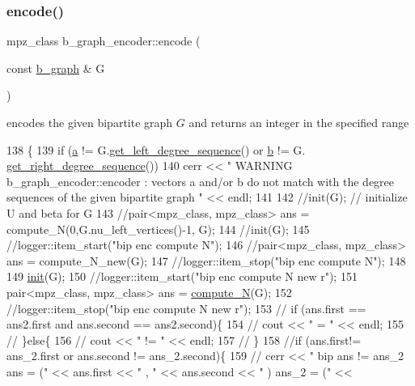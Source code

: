 \subsubsection{\texorpdfstring{encode()}{encode()}}
{\footnotesize\ttfamily mpz\+\_\+class b\+\_\+graph\+\_\+encoder\+::encode (\begin{DoxyParamCaption}\item[{const \hyperlink{classb__graph}{b\+\_\+graph} \&}]{G }\end{DoxyParamCaption})}



encodes the given bipartite graph $G$ and returns an integer in the specified range 


\begin{DoxyCode}
138 \{
139   \textcolor{keywordflow}{if} (\hyperlink{classb__graph__encoder_afd22d167f495cd85b41397f337c377c2}{a} != G.\hyperlink{classb__graph_afd65fb655f7e24217393a10533b87d3c}{get\_left\_degree\_sequence}() or \hyperlink{classb__graph__encoder_a767826e268702e45ab71565e096a52b8}{b} != G.
      \hyperlink{classb__graph_a2711566385b92b02f4c03abdc1f9a582}{get\_right\_degree\_sequence}())
140     cerr << \textcolor{stringliteral}{" WARNING b\_graph\_encoder::encoder : vectors a and/or b do not match with the degree sequences
       of the given bipartite graph  "} << endl;
141 
142   \textcolor{comment}{//init(G); // initialize U and beta for G}
143   \textcolor{comment}{//pair<mpz\_class, mpz\_class> ans = compute\_N(0,G.nu\_left\_vertices()-1, G);}
144   \textcolor{comment}{//init(G);}
145   \textcolor{comment}{//logger::item\_start("bip enc compute N");}
146   \textcolor{comment}{//pair<mpz\_class, mpz\_class> ans = compute\_N\_new(G);}
147   \textcolor{comment}{//logger::item\_stop("bip enc compute N");}
148 
149   \hyperlink{classb__graph__encoder_a9b62ac0580191ac42b98d764046af7cb}{init}(G);
150   \textcolor{comment}{//logger::item\_start("bip enc compute N new r");}
151   pair<mpz\_class, mpz\_class> ans = \hyperlink{classb__graph__encoder_a5a482e6783b10f2d95dd4afc0478eee0}{compute\_N}(G);
152   \textcolor{comment}{//logger::item\_stop("bip enc compute N new r");}
153   \textcolor{comment}{// if (ans.first == ans2.first and ans.second == ans2.second)\{}
154   \textcolor{comment}{//   cout << " = " << endl;}
155   \textcolor{comment}{// \}else\{}
156   \textcolor{comment}{//   cout << " != " << endl;}
157   \textcolor{comment}{// \}}
158   \textcolor{comment}{//if (ans.first!= ans\_2.first or ans.second != ans\_2.second)\{}
159   \textcolor{comment}{//  cerr << " bip ans != ans\_2 ans = (" << ans.first << " , " << ans.second <<  " ) ans\_2 = (" <<
}
\end{DoxyCode}

